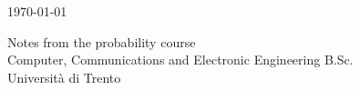 \makeatletter
\begin{titlepage}
    \begin{center}
        \vspace*{1cm}
 
        \Huge
        \textbf{\@title}
        \vspace{0.8cm}

        \large
        \@author

        \vspace{0.5cm}
        \today
 
        \vfill
        \normalsize
             
        Notes from the probability course\\
        Computer, Communications and Electronic Engineering B.Sc.\\
        Università di Trento\\
             
    \end{center}
\end{titlepage}
\makeatother